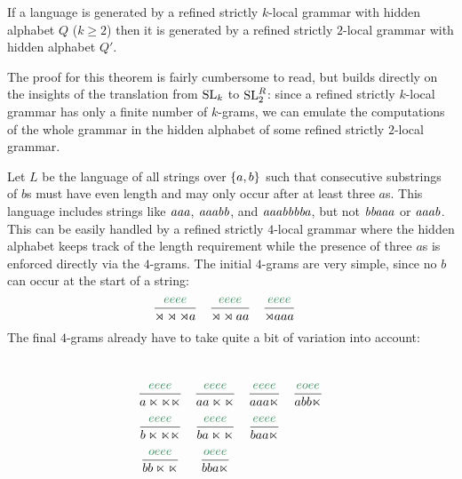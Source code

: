 \begin{theorem}
    If a language is generated by a refined strictly $k$-local grammar with hidden alphabet $Q$ ($k \geq 2$) then it is generated by a refined strictly $2$-local grammar with hidden alphabet $Q'$.
    \label{thm:REG_SL2}
\end{theorem}
%
The proof for this theorem is fairly cumbersome to read, but builds directly on the insights of the translation from $\mathrm{SL}_k$ to $\mathrm{SL}_2^R$: since a refined strictly $k$-local grammar has only a finite number of $k$-grams, we can emulate the computations of the whole grammar in the hidden alphabet of some refined strictly $2$-local grammar.
%
\begin{examplebox}
    Let $L$ be the language of all strings over $\left \{ a,b \right \}$ such that consecutive substrings of $b$s must have even length and may only occur after at least three $a$s. 
    \label{ex:REG_HiddenTranslation}
    This language includes strings like $\mathit{aaa}$, $\mathit{aaabb}$, and $\mathit{aaabbbba}$, but not $\mathit{bbaaa}$ or $\mathit{aaab}$.
    This can be easily handled by a refined strictly $4$-local grammar where the hidden alphabet keeps track of the length requirement while the presence of three $a$s is enforced directly via the $4$-grams.
    The initial $4$-grams are very simple, since no $b$ can occur at the start of a string:
    \[
        \begin{array}{cccc}
            \kState{eeee}{\LeftEdge \LeftEdge \LeftEdge a} &
            \kState{eeee}{\LeftEdge \LeftEdge a a} &
            \kState{eeee}{\LeftEdge a a a} &
        \end{array}
    \]
    The final $4$-grams already have to take quite a bit of variation into account:
    \[
        \begin{array}{cccc}
            \\[12pt]
            \kState{eeee}{a \RightEdge \RightEdge \RightEdge} &
            \kState{eeee}{a a \RightEdge \RightEdge} &
            \kState{eeee}{a a a\RightEdge} &
            \kState{eoee}{a b b\RightEdge}
            \\[12pt]
            \kState{eeee}{b \RightEdge \RightEdge \RightEdge} &
            \kState{eeee}{b a \RightEdge \RightEdge} &
            \kState{eeee}{b a a\RightEdge} &
            \\[12pt]
            \kState{oeee}{b b \RightEdge \RightEdge} &
            \kState{oeee}{b b a \RightEdge} &
            \\[12pt]

\end{array}\]
\end{examplebox}
